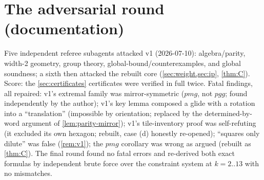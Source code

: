 \documentclass[11pt,a4paper,oneside]{article}
\theoremstyle{plain}
\theoremstyle{definition}
\theoremstyle{remark}
\begin{document}
\section{The adversarial round (documentation)}\label{sec:adversarial}

Five independent referee subagents attacked v1 (2026-07-10): algebra/parity, width-2
geometry, group theory, global-bound/counterexamples, and global soundness; a sixth then
attacked the rebuilt core (\cref{sec:weight,sec:ip}, \cref{thm:C}). Score: the
\cref{sec:certificates} certificates were verified in full twice. Fatal findings, all
repaired: v1's extremal family was mirror-symmetric ($pmg$, not $pgg$; found independently
by the author); v1's key lemma composed a glide with a rotation into a ``translation''
(impossible by orientation; replaced by the determined-by-word argument of
\cref{lem:parity-mirror}); v1's tile-inventory proof was self-refuting (it excluded its own
hexagon; rebuilt, case (d) honestly re-opened); ``squares only dilute'' was false
(\cref{rem:v1}); the $pmg$ corollary was wrong as argued (rebuilt as \cref{thm:C}).
The final round found no fatal errors and re-derived both exact formulas by independent
brute force over the constraint system at $k = 2..13$ with no mismatches.
\end{document}
